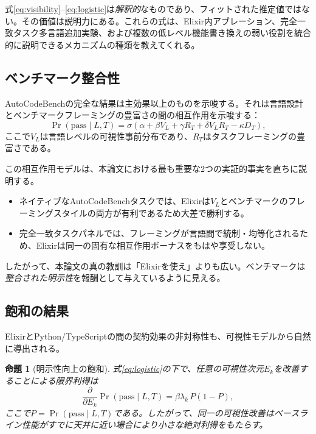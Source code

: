 \documentclass[11pt]{article}
\newtheorem{proposition}{命題}
\newcommand{\acb}{AutoCodeBench}
\newcommand{\elixir}{Elixir}
\newcommand{\pythonlang}{Python}
\newcommand{\tslang}{TypeScript}
\begin{document}
式\eqref{eq:visibility}--\eqref{eq:logistic}は\emph{解釈的}なものであり、フィットされた推定値ではない。その価値は説明力にある。これらの式は、Elixir内アブレーション、完全一致タスク多言語追加実験、および複数の低レベル機能書き換えの弱い役割を統合的に説明できるメカニズムの種類を教えてくれる。

\subsection{ベンチマーク整合性}

\acb{}の完全な結果は主効果以上のものを示唆する。それは言語設計とベンチマークフレーミングの豊富さの間の相互作用を示唆する：
\begin{equation}
\Pr(\mathrm{pass} \mid L,T) =
\sigma\!\left(
\alpha + \beta V_L + \gamma R_T + \delta V_L R_T - \kappa D_T
\right),
\label{eq:interaction}
\end{equation}
ここで$V_L$は言語レベルの可視性事前分布であり、$R_T$はタスクフレーミングの豊富さである。

この相互作用モデルは、本論文における最も重要な2つの実証的事実を直ちに説明する。

\begin{itemize}
  \item ネイティブな\acb{}タスクでは、\elixir{}は$V_L$とベンチマークのフレーミングスタイルの両方が有利であるため大差で勝利する。
  \item 完全一致タスクパネルでは、フレーミングが言語間で統制・均等化されるため、\elixir{}は同一の固有な相互作用ボーナスをもはや享受しない。
\end{itemize}

したがって、本論文の真の教訓は「\elixir{}を使え」よりも広い。ベンチマークは\emph{整合された明示性}を報酬として与えているように見える。

\subsection{飽和の結果}

\elixir{}と\pythonlang{}/\tslang{}の間の契約効果の非対称性も、可視性モデルから自然に導出される。

\begin{proposition}[明示性向上の飽和]
式\eqref{eq:logistic}の下で、任意の可視性次元$E_k$を改善することによる限界利得は
\begin{equation}
\frac{\partial}{\partial E_k} \Pr(\mathrm{pass} \mid L,T)
=
\beta \lambda_k \, P(1-P),
\label{eq:derivative}
\end{equation}
ここで$P = \Pr(\mathrm{pass} \mid L,T)$である。したがって、同一の可視性改善はベースライン性能がすでに天井に近い場合により小さな絶対利得をもたらす。
\end{proposition}
\end{document}
